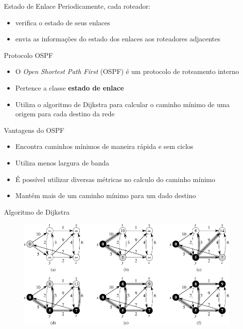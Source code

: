 \documentclass{beamer}
\newlength{\wideitemsep}
\let\olditem\item
\renewcommand{\item}{\setlength{\itemsep}{\wideitemsep}\olditem}
\begin{document}
\begin{frame}{Estado de Enlace}
Periodicamente, cada roteador:
\begin{itemize}
 \olditem verifica o estado de seus enlaces %
 \olditem envia as informações do estado dos enlaces aos roteadores adjacentes %
\end{itemize}
\end{frame}

\begin{frame}{Protocolo OSPF}
\begin{itemize}
 \item O \textit{Open Shortest Path First} (OSPF) é um protocolo de roteamento interno %
 \item Pertence a classe \textbf{estado de enlace} %
 \item Utiliza o algoritmo de Dijkstra para calcular o caminho mínimo de uma origem para cada destino da rede %
\end{itemize}
\end{frame}

\begin{frame}{Vantagens do OSPF}
\begin{itemize}
 \item Encontra caminhos mínimos de maneira rápida e sem ciclos %
 \item Utiliza menos largura de banda %
 \item É possível utilizar diversas métricas no calculo do caminho mínimo %
 \item Mantém mais de um caminho mínimo para um dado destino %
\end{itemize}
\end{frame}

\begin{frame}{Algoritmo de Dijkstra}
\begin{figure}[!htb]
\centering
\includegraphics[scale=0.75]{../fig24_6.jpg}
\end{figure}
\end{frame}
\end{document}
